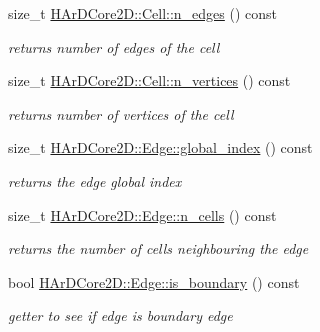 \begin{DoxyCompactItemize}
\mbox{\label{group__Mesh_ga1b0586610a05e1a7a64bbe11f59e9b19}} 
size\+\_\+t \hyperlink{group__Mesh_ga1b0586610a05e1a7a64bbe11f59e9b19}{H\+Ar\+D\+Core2\+D\+::\+Cell\+::n\+\_\+edges} () const
\begin{DoxyCompactList}\small\item\em returns number of edges of the cell \end{DoxyCompactList}\item 
\mbox{\label{group__Mesh_ga70f9744e4ff553db7f0e147342319f43}} 
size\+\_\+t \hyperlink{group__Mesh_ga70f9744e4ff553db7f0e147342319f43}{H\+Ar\+D\+Core2\+D\+::\+Cell\+::n\+\_\+vertices} () const
\begin{DoxyCompactList}\small\item\em returns number of vertices of the cell \end{DoxyCompactList}\item 
\mbox{\label{group__Mesh_ga774e975ebad5e6bdccf549215293d624}} 
size\+\_\+t \hyperlink{group__Mesh_ga774e975ebad5e6bdccf549215293d624}{H\+Ar\+D\+Core2\+D\+::\+Edge\+::global\+\_\+index} () const
\begin{DoxyCompactList}\small\item\em returns the edge global index \end{DoxyCompactList}\item 
\mbox{\label{group__Mesh_ga0926b705b6169b73293e60e0c48e85f8}} 
size\+\_\+t \hyperlink{group__Mesh_ga0926b705b6169b73293e60e0c48e85f8}{H\+Ar\+D\+Core2\+D\+::\+Edge\+::n\+\_\+cells} () const
\begin{DoxyCompactList}\small\item\em returns the number of cells neighbouring the edge \end{DoxyCompactList}\item 
\mbox{\label{group__Mesh_ga10424f4b99793ab359b5dd099f9255ee}} 
bool \hyperlink{group__Mesh_ga10424f4b99793ab359b5dd099f9255ee}{H\+Ar\+D\+Core2\+D\+::\+Edge\+::is\+\_\+boundary} () const
\begin{DoxyCompactList}\small\item\em getter to see if edge is boundary edge \end{DoxyCompactList}\item 
\mbox{\label{group__Mesh_ga41ebc04d2b292197a02a9afd25a76a18}} 

\end{DoxyCompactItemize}
